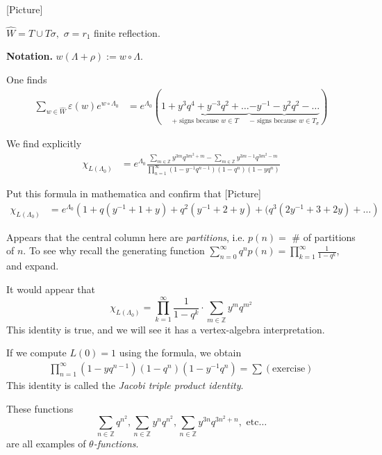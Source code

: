 [Picture]

$\hat{W}=T \cup  T\sigma,$ $\sigma=r_1$ finite reflection.

\medskip\noindent
{\bf Notation.} $w(\Lambda+\rho):=w \circ \Lambda.$

One finds
\begin{align*}
\sum_{w \in \widehat{W}}\varepsilon(w)e^{w \circ \Lambda_0}&=
e^{\Lambda_0}\left(
\underbrace{1+y^3q^4+y^{-3}q^2+\ldots}_{\text{+ signs because $w \in T$}}
\underbrace{-y^{-1}-y^2q^2-\ldots}_{\text{$-$ signs because $w \in T_\sigma$}}
\right)
\end{align*}

We find explicitly
\begin{align*}
\chi_{L(\Lambda_0)}&=e^{\Lambda_0}
\frac{\sum_{m \in \mathbb{Z}}
y^{3m}q^{3m^2+m}-\sum_{m \in \mathbb{Z}}
y^{3m-1}q^{3m^2-m}}
{\prod_{n=1}^\infty(1-y^{-1}q^{n-1})(1-q^n)(1-yq^n)}
\end{align*}

\begin{exercise}
\label{exercise-mathematica}
Put this formula in mathematica and confirm that [Picture]
\begin{align*}
\chi_{L(\Lambda_0)}&=e^{\Lambda_0}
\left(1+q(y^{-1}+1+y)+q^2(y^{-1}+2+y)
+(q^3(2y^{-1}+3+2y)+\ldots\right)
\end{align*}
\end{exercise}

Appears that the central column here are {\it partitions}, i.e. 
$p(n)=$ \# of partitions of $n$. To see why recall the generating function
$\sum_{n=0}^\infty q^np(n)=\prod_{k=1}^\infty\frac{1}{1-q^k}$, and expand.

It would appear that
$$
\chi_{L(\Lambda_0)}=
\prod_{k=1}^\infty\frac{1}{1-q^k}\cdot \sum_{m \in \mathbb{Z}}y^mq^{m^2}
$$
This identity is true, and we will see it has a vertex-algebra interpretation.

\begin{remark}
\label{remark-Jacobi-triple-product-identity}
If we compute $L(0)=1$ using the formula, we obtain
\begin{align*}
\prod_{n=1}^\infty(1-yq^{n-1})(1-q^n)(1-y^{-1}q^n)=\sum(\text{exercise})
\end{align*}
This identity is called the {\it Jacobi triple product identity}.
\end{remark}

These functions
$$
\sum_{n \in \mathbb{Z}}q^{n^2}, \sum_{n \in \mathbb{Z}}y^n q^{n^2},
\sum_{n \in \mathbb{Z}}y^{3n}q^{3n^2+n},\text{ etc…}
$$
are all examples of {\it $\theta$-functions}.

